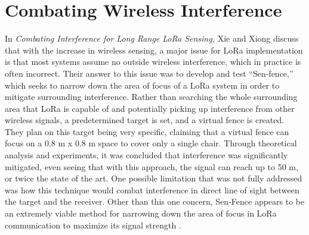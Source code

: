 \documentclass[sigsmall]{acmart}
\begin{document}
\section*{Combating Wireless Interference}
In \textit{Combating Interference for Long Range LoRa Sensing,} Xie and Xiong discuss that with the increase in wireless sensing, a major issue for LoRa implementation is that most systems assume no outside wireless interference, which in practice is often incorrect. Their answer to this issue was to develop and test “Sen-fence,” which seeks to narrow down the area of focus of a LoRa system in order to mitigate surrounding interference. Rather than searching the whole surrounding area that LoRa is capable of and potentially picking up interference from other wireless signals, a predetermined target is set, and a virtual fence is created. They plan on this target being very specific, claiming that a virtual fence can focus on a 0.8 m x 0.8 m space to cover only a single chair. Through theoretical analysis and experiments, it was concluded that interference was significantly mitigated, even seeing that with this approach, the signal can reach up to 50 m, or twice the state of the art. One possible limitation that was not fully addressed was how this technique would combat interference in direct line of sight between the target and the receiver. Other than this one concern, Sen-Fence appears to be an extremely viable method for narrowing down the area of focus in LoRa communication to maximize its signal strength \cite{10.1145/3384419.3430731}.  
\end{document}
